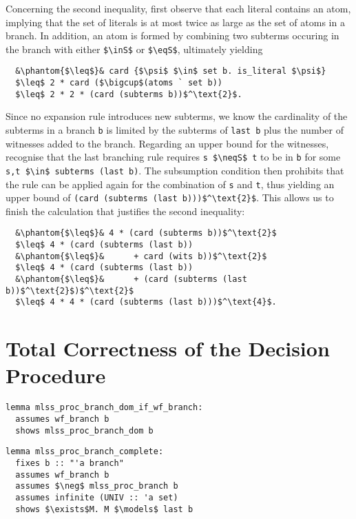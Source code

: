 \documentclass[sigplan,10pt,anonymous,review]{acmart}
\newcommand{\inS}{\in_\text{s}}
\newcommand{\eqS}{=_\text{s}}
\newcommand{\neqS}{\neq_\text{s}}
\begin{document}
Concerning the second inequality, first observe that each literal contains an atom, implying that the set of literals is at most twice as large as the set of atoms in a branch. 
In addition, an atom is formed by combining two subterms occuring in the branch with either \lstinline!$\inS$! or \lstinline!$\eqS$!, ultimately yielding
\begin{lstlisting}
  &\phantom{$\leq$}& card {$\psi$ $\in$ set b. is_literal $\psi$}
  $\leq$ 2 * card ($\bigcup$(atoms ` set b))
  $\leq$ 2 * 2 * (card (subterms b))$^\text{2}$.
\end{lstlisting}
Since no expansion rule introduces new subterms, we know the cardinality of the subterms in a branch \lstinline!b! is limited by the subterms of \lstinline!last b! plus the number of witnesses added to the branch.
Regarding an upper bound for the witnesses, recognise that the last branching rule requires \lstinline!s $\neqS$ t! to be in \lstinline!b! for some \lstinline!s,t $\in$ subterms (last b)!.
The subsumption condition then prohibits that the rule can be applied again for the combination of \lstinline!s! and \lstinline!t!, thus yielding an upper bound of \lstinline!(card (subterms (last b)))$^\text{2}$!.
This allows us to finish the calculation that justifies the second inequality:
\begin{lstlisting}
  &\phantom{$\leq$}& 4 * (card (subterms b))$^\text{2}$
  $\leq$ 4 * (card (subterms (last b))
  &\phantom{$\leq$}&      + card (wits b))$^\text{2}$
  $\leq$ 4 * (card (subterms (last b))
  &\phantom{$\leq$}&      + (card (subterms (last b))$^\text{2}$)$^\text{2}$
  $\leq$ 4 * 4 * (card (subterms (last b)))$^\text{4}$.
\end{lstlisting}

\section{Total Correctness of the Decision Procedure\label{sec:correct}}

\begin{lstlisting}
lemma mlss_proc_branch_dom_if_wf_branch:
  assumes wf_branch b
  shows mlss_proc_branch_dom b
\end{lstlisting}

\begin{lstlisting}
lemma mlss_proc_branch_complete:
  fixes b :: "'a branch"
  assumes wf_branch b
  assumes $\neg$ mlss_proc_branch b
  assumes infinite (UNIV :: 'a set)
  shows $\exists$M. M $\models$ last b

\end{lstlisting}
\end{document}
